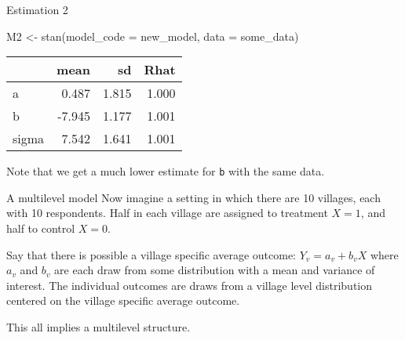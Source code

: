 \documentclass[
  11pt,
  ignorenonframetext,
]{beamer}
\newenvironment{Shaded}{\begin{snugshade}}{\end{snugshade}}
\newcommand{\AttributeTok}[1]{\textcolor[rgb]{0.40,0.45,0.13}{#1}}
\newcommand{\FunctionTok}[1]{\textcolor[rgb]{0.28,0.35,0.67}{#1}}
\newcommand{\NormalTok}[1]{\textcolor[rgb]{0.00,0.23,0.31}{#1}}
\newcommand{\OtherTok}[1]{\textcolor[rgb]{0.00,0.23,0.31}{#1}}
\begin{document}
\begin{frame}[fragile]{Estimation 2}
\protect\hypertarget{estimation-2-1}{}
\begin{Shaded}
\begin{Highlighting}[]
\NormalTok{M2 }\OtherTok{\textless{}{-}} \FunctionTok{stan}\NormalTok{(}\AttributeTok{model\_code =}\NormalTok{ new\_model, }\AttributeTok{data =}\NormalTok{ some\_data)}
\end{Highlighting}
\end{Shaded}

\begin{tabular}{l|r|r|r}
\hline
  & mean & sd & Rhat\\
\hline
a & 0.487 & 1.815 & 1.000\\
\hline
b & -7.945 & 1.177 & 1.001\\
\hline
sigma & 7.542 & 1.641 & 1.001\\
\hline
\end{tabular}

Note that we get a much lower estimate for \texttt{b} with the same
data.
\end{frame}

\begin{frame}{A multilevel model}
\protect\hypertarget{a-multilevel-model-1}{}
Now imagine a setting in which there are 10 villages, each with 10
respondents. Half in each village are assigned to treatment \(X=1\), and
half to control \(X=0\).

Say that there is possible a village specific average outcome:
\(Y_v = a_v + b_vX\) where \(a_v\) and \(b_v\) are each draw from some
distribution with a mean and variance of interest. The individual
outcomes are draws from a village level distribution centered on the
village specific average outcome.

This all implies a multilevel structure.
\end{frame}
\end{document}
